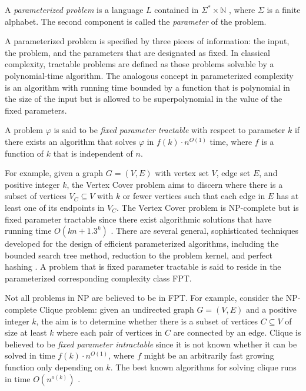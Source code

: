 \begin{definition} A {\em parameterized problem} is a language $L$ contained in $\Sigma^* \times \mathbb{N}$ , where $\Sigma$ is a finite alphabet. The second component is called the {\em parameter} of the problem. \end{definition}

A parameterized problem is specified by three pieces of information: the input, the problem, and the parameters that are designated as fixed.  In classical complexity, tractable problems are defined as those problems solvable by a polynomial-time algorithm.  The analogous concept in parameterized complexity is an algorithm with running time bounded by a function that is polynomial in the size of the input but is allowed to be superpolynomial in the value of the fixed parameters.  

\begin{definition} A problem $\varphi$ is said to be {\em fixed parameter tractable}  with respect to parameter $k$ if there exists an algorithm that solves $\varphi$  in $f(k) \cdot n^{O(1)}$ time, where $f$ is a function of $k$ that is independent of $n$. \end{definition}  

For example, given a graph $G =(V, E)$ with vertex set $V$, edge set $E$, and positive integer $k$, the {\sc Vertex Cover} problem aims to discern where there is a subset of vertices $V_C \subseteq V$ with $k$ or fewer vertices such that each edge in $E$ has at least one of its endpoints in $V_C$.  The {\sc Vertex Cover} problem is NP-complete \cite{GJ} but is fixed parameter tractable since there exist algorithmic solutions that have running time $O(kn + 1.3^k)$ \cite{DF99}. There are several general, sophisticated techniques developed for the design of efficient parameterized algorithms, including the bounded search tree method, reduction to the problem kernel, and perfect hashing \cite{DF99}.   A problem that is fixed parameter tractable is said to reside in the parameterized corresponding complexity class FPT.   

Not all problems in NP are believed to be in FPT.  For example, consider the NP-complete {\sc Clique} problem: given an undirected graph $G=(V, E)$ and a positive integer $k$, the aim is to determine whether there is a subset of vertices $C \subseteq V$ of size at least $k$ where each pair of vertices in $C$ are connected by an edge.  {\sc Clique} is believed to be {\em fixed parameter intractable} since it is not known whether it can be solved in time $f(k) \cdot n^{O(1)}$, where $f$ might be an arbitrarily fast growing function only depending on $k$. The best known algorithms for solving clique runs in time $O(n^{o(k)})$ \cite{DF99}.  

